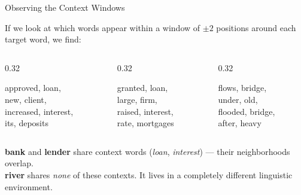 \documentclass[aspectratio=169]{beamer}
\begin{document}
\begin{frame}{Observing the Context Windows}

If we look at which words appear within a window of $\pm 2$ positions
around each target word, we find:

\begin{columns}[T]
\begin{column}{0.32\textwidth}
\begin{tcolorbox}[colback=blue!5!white, colframe=blue!75!black,
  title=\textbf{bank}]
{\small
approved, loan,\\
new, client,\\
increased, interest,\\
its, deposits}
\end{tcolorbox}
\end{column}

\begin{column}{0.32\textwidth}
\begin{tcolorbox}[colback=blue!5!white, colframe=blue!75!black,
  title=\textbf{lender}]
{\small
granted, loan,\\
large, firm,\\
raised, interest,\\
rate, mortgages}
\end{tcolorbox}
\end{column}

\begin{column}{0.32\textwidth}
\begin{tcolorbox}[colback=red!5!white, colframe=red!70!black,
  title=\textbf{river}]
{\small
flows, bridge,\\
under, old,\\
flooded, bridge,\\
after, heavy}
\end{tcolorbox}
\end{column}
\end{columns}

\begin{tcolorbox}[colback=green!5!white, colframe=green!60!black,
  title=\textbf{Key observation}]
\textbf{bank} and \textbf{lender} share context words
(\emph{loan}, \emph{interest}) --- their neighborhoods overlap.\\[4pt]
\textbf{river} shares \emph{none} of these contexts.
It lives in a completely different linguistic environment.
\end{tcolorbox}

\end{frame}
%
\end{document}
